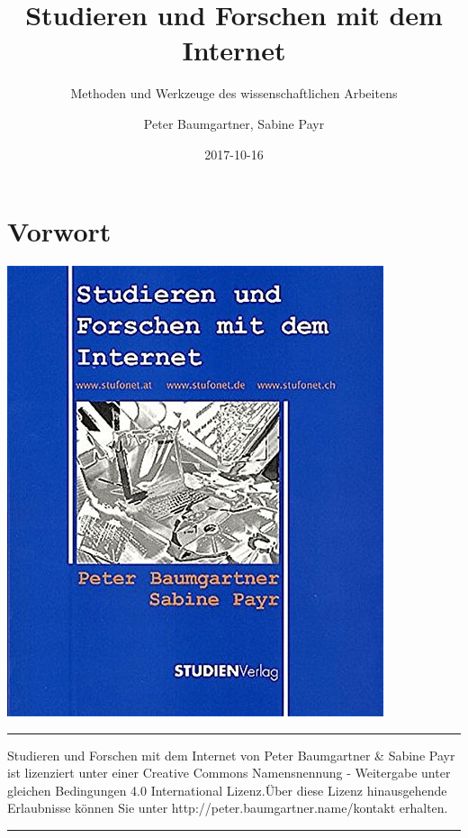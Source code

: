 \documentclass[]{book}
\title{Studieren und Forschen mit dem Internet}
\subtitle{Methoden und Werkzeuge des wissenschaftlichen Arbeitens}
\author{Peter Baumgartner, Sabine Payr}
\date{2017-10-16}
\theoremstyle{definition}
\theoremstyle{definition}
\theoremstyle{definition}
\theoremstyle{remark}
\begin{document}
\maketitle

{
\hypersetup{linkcolor=black}
\setcounter{tocdepth}{2}
\tableofcontents
}
\chapter*{Vorwort}\label{vorwort}

\begin{center}\href{http://www.studienverlag.at/page.cfm?vpath=buecher/buchdetail&titnr=1319}{\includegraphics{images/cover-stufonet-min} }\end{center}

\begin{center}\rule{0.5\linewidth}{\linethickness}\end{center}

{Studieren und Forschen mit dem Internet} von Peter Baumgartner \&
Sabine Payr ist lizenziert unter einer Creative Commons Namensnennung -
Weitergabe unter gleichen Bedingungen 4.0 International Lizenz.Über
diese Lizenz hinausgehende Erlaubnisse können Sie unter
http://peter.baumgartner.name/kontakt erhalten.

\begin{center}\rule{0.5\linewidth}{\linethickness}\end{center}
\end{document}

